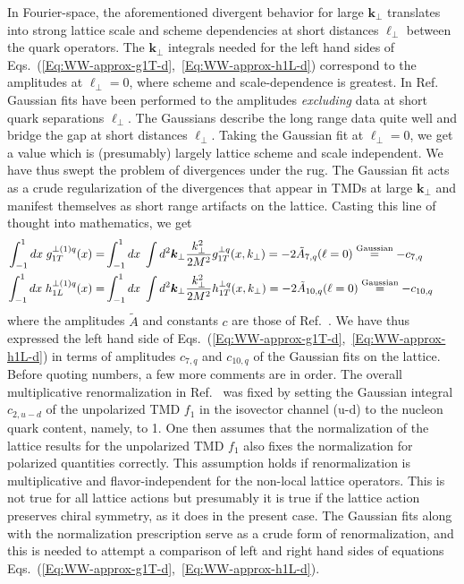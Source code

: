 \documentclass[a4paper,11pt]{article}
\newcommand{\ba}{\begin{eqnarray}}
\newcommand{\ea}{\end{eqnarray}}
\def\bflperp{{\bm \ell}_\perp}
\def\bfkperp{{\bm k}_\perp}
\def\kperp{k_\perp}
\begin{document}
In Fourier-space, the aforementioned divergent behavior for large $\bfkperp$ 
translates into strong lattice scale and scheme dependencies at short distances
$\bflperp$ between the quark operators. The $\bfkperp$ integrals needed for 
the left hand sides of Eqs.~(\ref{Eq:WW-approx-g1T-d},~\ref{Eq:WW-approx-h1L-d})
correspond to the amplitudes at $\bflperp = 0$, where scheme and 
scale-dependence is greatest.  In Ref.~\cite{Musch:2010ka} Gaussian fits 
have been performed to the amplitudes \emph{excluding} data at short quark 
separations $\bflperp$. The Gaussians describe the long range data quite well 
and bridge the gap at short distances $\bflperp$. 
Taking the Gaussian fit at $\bflperp = 0$, we get a value which is 
(presumably) largely lattice scheme and scale independent. We have thus 
swept the problem of divergences under the rug. The Gaussian fit acts as 
a crude regularization of the divergences that appear in TMDs at large 
$\bfkperp$ and manifest themselves as short range artifacts on the lattice. 
Casting this line of thought into mathematics, we get
\ba
    	\int_{-1}^1 d x\; g_{1T}^{\perp(1)q}(x) 
	= & \int_{-1}^1 d x\; \int  d^2 \bfkperp 
	\frac{\kperp^2}{2M^2} g_{1T}^{\perp q}(x,\kperp) 
	= -2 \tilde{A}_{7,q}( \ell = 0 ) 
	\stackrel{\text{\scriptsize Gaussian}}{=} -c_{7,q} \quad \quad \\
    	\int_{-1}^1 d x\; h_{1L}^{\perp(1)q}(x) 
	= & \int_{-1}^1 d x\; \int  d^2 \bfkperp 
	\frac{\kperp^2}{2M^2} h_{1T}^{\perp q}(x,\kperp) 
	= -2 \tilde{A}_{10,q}( \ell = 0 )
	\stackrel{\text{\scriptsize Gaussian}}{=} -c_{10,q} \quad \quad
\ea
where the amplitudes $\tilde{A}$ and constants $c$ are those of Ref.~\cite{Musch:2010ka}.
We have thus expressed the left hand side of 
Eqs.~(\ref{Eq:WW-approx-g1T-d},~\ref{Eq:WW-approx-h1L-d}) in terms of 
amplitudes $c_{7,q}$ and $c_{10,q}$ of the Gaussian fits on the lattice.
Before quoting numbers, a few more comments are in order. The overall 
multiplicative renormalization in Ref.~\cite{Musch:2010ka} was fixed by 
setting the Gaussian integral $c_{2,u-d}$ of the unpolarized TMD $f_1$ 
in the isovector channel (u-d) to the nucleon quark content, namely, to 1.
 One then assumes that the normalization of the lattice results for the 
unpolarized TMD $f_1$ also fixes the normalization for polarized quantities 
correctly. This assumption holds if renormalization is multiplicative and 
flavor-independent for the non-local lattice operators. This is not true 
for all lattice actions \cite{Yoon:2017qzo} %
but presumably it is true if the lattice action preserves chiral symmetry, 
as it does in the present case.
The Gaussian fits along with the normalization prescription serve as
a crude form of renormalization, and this is needed to attempt
a comparison of left and right hand sides of equations  
Eqs.~(\ref{Eq:WW-approx-g1T-d},~\ref{Eq:WW-approx-h1L-d}).
\end{document}
